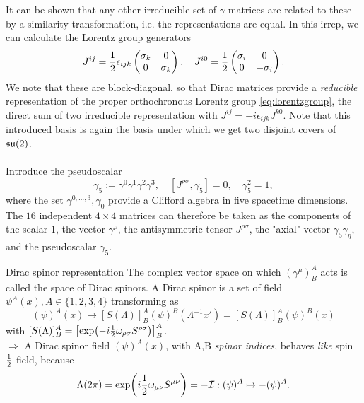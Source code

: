 It can be shown that any other irreducible set of $\gamma$-matrices are related to these by a similarity transformation, i.e. the representations are equal. In this irrep, we can calculate the Lorentz group generators
\begin{equation}
J^{ij} = \frac{1}{2} \epsilon_{ijk} \begin{pmatrix}
\sigma_k &0\\0&\sigma_k\\
\end{pmatrix}
,\quad 
J^{i0} = \frac{1}{2} \begin{pmatrix}
\sigma_i&0\\0&-\sigma_i\\
\end{pmatrix}.
\end{equation}
We note that these are block-diagonal, so that Dirac matrices provide a \emph{reducible} representation of the proper orthochronous Lorentz group \ref{eq:lorentzgroup}, the direct sum of two irreducible representation with $J^{ij} = \pm i \epsilon_{ijk} J^{k0}$. Note that this introduced basis is again the basis under which we get two disjoint covers of $\mathfrak{su}(2)$.\\
\\
 Introduce the pseudoscalar
 \begin{equation}
 	\gamma_5 := \gamma^0\gamma^1 \gamma^2\gamma^3,\quad [J^{\rho \sigma},\gamma_5]=0,\quad \gamma^2_5=1,
 \end{equation}
 where the set $\gamma^{0,\dots,3},\gamma_0$ provide a Clifford algebra in five spacetime dimensions. The $16$ independent $4\times4$ matrices can therefore be taken as the components of the scalar $1$, the vector $\gamma^\rho$, the antisymmetric tensor $J^{\rho \sigma}$, the "axial" vector $\gamma_5\gamma_\eta$, and the pseudoscalar $\gamma_5$.
\begin{mybox}{Dirac spinor representation}
	The complex vector space on which $(\gamma^{\mu})^A_B$ acts is called the space of Dirac spinors. A Dirac spinor is a set of field $\psi^A(x), A\in \{1,2,3,4\}$ transforming as
	\begin{equation}
	(\psi)^A(x) \mapsto [S(\Lambda)]^A_B (\psi)^B (\Lambda^{-1} x') = [S(\Lambda)]^A_B (\psi)^B(x) 
	\end{equation}
	with $[S(\Lambda)]^A_B = \left[\exp(-i \frac{1}{2} \omega_{\rho \sigma} S^{\rho \sigma} )\right]^A_B$.\\
	$\Rightarrow$ A Dirac spinor field $(\psi)^A(x)$, with A,B \emph{spinor indices}, behaves \emph{like} spin $\frac{1}{2}$-field, because
	\begin{equation}
	\Lambda(2 \pi) = \exp(i \frac{1}{2} \omega_{\mu \nu} S^{\mu \nu} ) = - \mathcal{I}: (\psi)^A \mapsto -(\psi)^A.
	\end{equation}
\end{mybox}
